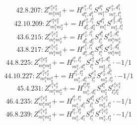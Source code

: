 \documentclass[letterpaper,10pt,fleqn,leqno,onecolumn]{article}
\begin{document}
\begin{equation} \;\;\;\;\;\;  42.8.207: Z^{e_{1}^{a}e_{2}^{a}}_{m_{1}^{a}m_{2}^{a}}+=H^{e_{1}^{a},l_{1}^{b}}_{d_{1}^{a},d_{1}^{b}}S^{d_{1}^{a}}_{m_{1}^{a}}S^{e_{2}^{a},d_{1}^{b}}_{m_{2}^{a},l_{1}^{b}} \end{equation}
\begin{equation} \;\;\;\;\;\;  42.10.209: Z^{e_{1}^{a}e_{2}^{a}}_{m_{1}^{a}m_{2}^{a}}+=H^{e_{1}^{a},l_{1}^{a}}_{d_{1}^{a},d_{2}^{a}}S^{d_{1}^{a}}_{m_{1}^{a}}S^{e_{2}^{a},d_{2}^{a}}_{m_{2}^{a},l_{1}^{a}} \end{equation}
\begin{equation} \;\;\;\;\;\;  43.6.215: Z^{e_{1}^{a}e_{2}^{a}}_{m_{1}^{a}m_{2}^{a}}+=H^{e_{1}^{a},l_{1}^{b}}_{d_{1}^{b},d_{1}^{a}}S^{d_{1}^{b}}_{l_{1}^{b}}S^{e_{2}^{a},d_{1}^{a}}_{m_{1}^{a}m_{2}^{a}} \end{equation}
\begin{equation} \;\;\;\;\;\;  43.8.217: Z^{e_{1}^{a}e_{2}^{a}}_{m_{1}^{a}m_{2}^{a}}+=H^{e_{1}^{a},l_{1}^{a}}_{d_{1}^{a},d_{2}^{a}}S^{d_{1}^{a}}_{l_{1}^{a}}S^{e_{2}^{a},d_{2}^{a}}_{m_{1}^{a}m_{2}^{a}} \end{equation}
\begin{equation} \;\;\;\;\;\;  44.8.225: Z^{e_{1}^{a}e_{2}^{a}}_{m_{1}^{a}m_{2}^{a}}+=H^{l_{1}^{a},l_{1}^{b}}_{m_{1}^{a},d_{1}^{b}}S^{e_{1}^{a}}_{l_{1}^{a}}S^{e_{2}^{a},d_{1}^{b}}_{m_{2}^{a},l_{1}^{b}}\cdot -1/1 \end{equation}
\begin{equation} \;\;\;\;\;\;  44.10.227: Z^{e_{1}^{a}e_{2}^{a}}_{m_{1}^{a}m_{2}^{a}}+=H^{l_{1}^{a},l_{2}^{a}}_{m_{1}^{a},d_{1}^{a}}S^{e_{1}^{a}}_{l_{1}^{a}}S^{e_{2}^{a},d_{1}^{a}}_{m_{2}^{a},l_{2}^{a}}\cdot -1/1 \end{equation}
\begin{equation} \;\;\;\;\;\;  45.4.231: Z^{e_{1}^{a}e_{2}^{a}}_{m_{1}^{a}m_{2}^{a}}+=H^{l_{1}^{a}l_{2}^{a}}_{m_{1}^{a},d_{1}^{a}}S^{d_{1}^{a}}_{m_{2}^{a}}S^{e_{1}^{a}e_{2}^{a}}_{l_{1}^{a}l_{2}^{a}} \end{equation}
\begin{equation} \;\;\;\;\;\;  46.4.235: Z^{e_{1}^{a}e_{2}^{a}}_{m_{1}^{a}m_{2}^{a}}+=H^{l_{1}^{b},l_{1}^{a}}_{m_{1}^{a},d_{1}^{b}}S^{d_{1}^{b}}_{l_{1}^{b}}S^{e_{1}^{a}e_{2}^{a}}_{m_{2}^{a},l_{1}^{a}}\cdot -1/1 \end{equation}
\begin{equation} \;\;\;\;\;\;  46.8.239: Z^{e_{1}^{a}e_{2}^{a}}_{m_{1}^{a}m_{2}^{a}}+=H^{l_{1}^{a},l_{2}^{a}}_{m_{1}^{a},d_{1}^{a}}S^{d_{1}^{a}}_{l_{1}^{a}}S^{e_{1}^{a}e_{2}^{a}}_{m_{2}^{a},l_{2}^{a}}\cdot -1/1 \end{equation}
\end{document}
